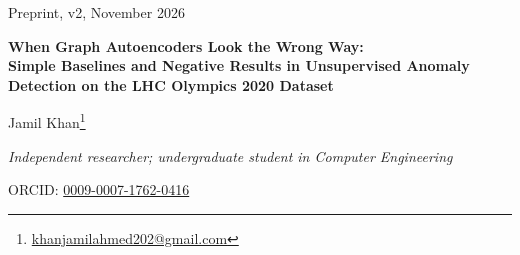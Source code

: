 \documentclass[11pt,a4paper]{article}
\newcommand{\pt}{\ensuremath{p_\mathrm{T}}\xspace}
\newcommand{\HT}{\ensuremath{H_\mathrm{T}}\xspace}
\newcommand{\tauTO}{\ensuremath{\tau_{21}}\xspace}
\newcommand{\ptmean}{\ensuremath{\langle \pt \rangle}\xspace}
\begin{document}
\begin{titlepage}
\begin{flushright}
\small Preprint, v2, November 2026
\end{flushright}
\vspace*{1.5cm}
\begin{center}
{\LARGE\bfseries When Graph Autoencoders Look the Wrong Way:\\[0.4em]
\Large Simple Baselines and Negative Results in Unsupervised Anomaly Detection on the LHC Olympics 2020 Dataset\par}
\vspace{1.2cm}
{\large Jamil Khan\footnote{\href{mailto:khanjamilahmed202@gmail.com}{khanjamilahmed202@gmail.com}}\par}
\vspace{0.3cm}
{\itshape Independent researcher; undergraduate student in Computer Engineering\par}
\vspace{0.2cm}
{\small ORCID: \href{https://orcid.org/0009-0007-1762-0416}{0009-0007-1762-0416}\par}
\vspace{1.5cm}
\begin{abstract}
\noindent
Graph autoencoders (GAEs) trained only on background are a natural candidate for model-agnostic
new-physics searches. I tested two of them on the LHC Olympics 2020 R\&D dataset, where a
$W'\to XY\to(q\bar q)(q\bar q)$ dijet resonance is hidden in QCD background. The first is a node-level
GAE that scores per-particle reconstruction error. The second encodes the whole event, reconstructs it
with a set decoder and a Chamfer loss, and offers three scores: reconstruction error, latent
$k$-nearest-neighbour distance and latent Gaussian-mixture likelihood. The decision criterion was fixed
before looking at any test result. Neither model beats simple label-free observables. The node-level model reaches an AUC of
$0.483\pm0.005$ with max-reduction and $0.781$ with mean-reduction; all three event-level scores are
\emph{inverted}, with AUCs between $0.401$ and $0.436$, stable across seeds, nine ablations, and
signal-contaminated training. By contrast, the mean transverse momentum per particle,
$\ptmean=\HT/N$, reaches $0.811$, and $-\tauTO$ of the leading jet reaches $0.801$.
Correlation and binned analyses suggest that the latent-density scores track event complexity: the
signal has fewer, harder particles than QCD. A follow-up with five studies does not support
complexity as the main cause. Matching the multiplicity of the background to the signal raises the

\end{abstract}
\end{center}
\end{titlepage}
\end{document}
